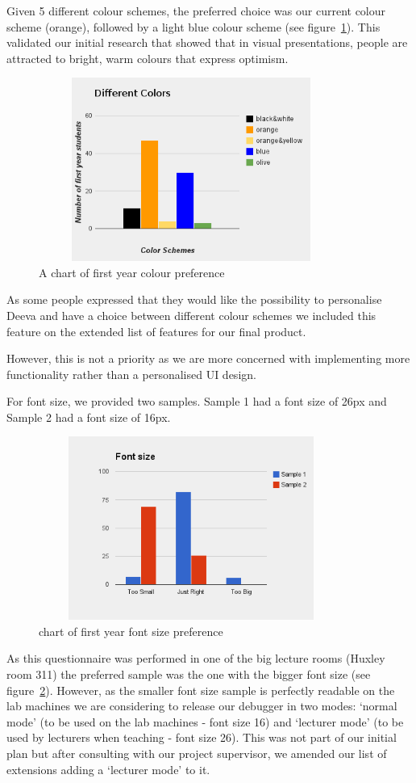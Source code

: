 \documentclass[11pt, a4paper]{article}
\begin{document}
Given 5 different colour schemes, the preferred choice was our current colour scheme (orange), followed by a light blue colour scheme (see figure~\ref{fig:colours}).
This validated our initial research that showed that in visual presentations, people are attracted to bright, warm colours that express optimism.
\begin{figure}[h!]
\centering
\includegraphics[height=60mm,width=100mm]{colours.png}
\caption{A chart of first year colour preference}
\label{fig:colours}
\end{figure}

As some people expressed that they would like the possibility to personalise Deeva and have a choice between different colour schemes we included this feature on the extended list of features for our final product.

However, this is not a priority as we are more concerned with implementing more functionality rather than a personalised UI design.

For font size, we provided two samples.
Sample 1 had a font size of 26px and Sample 2 had a font size of 16px.
\begin{figure}[h!]
\centering
\includegraphics[height=60mm,width=100mm]{fonts.png}
\caption{chart of first year font size preference}
\label{fig:label}
\end{figure}
As this questionnaire was performed in one of the big lecture rooms (Huxley room 311) the preferred sample was the one with the bigger font size (see figure~\ref{fig:label}).
However, as the smaller font size sample is perfectly readable on the lab machines we are considering to release our debugger in two modes: `normal mode' (to be used on the lab machines - font size 16) and  `lecturer mode' (to be used by lecturers when teaching - font size 26).
This was not part of our initial plan but after consulting with our project supervisor, we amended our list of extensions adding a `lecturer mode' to it.
\end{document}
